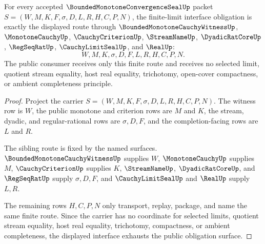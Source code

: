 \begin{theorem}
\label{thm:bounded-monotone-convergence-seal-finite-limit-interface-obligations}
For every accepted $\BoundedMonotoneConvergenceSealUp$ packet $S=(W,M,K,F,\sigma,D,L,R,H,C,P,N)$, the finite-limit interface obligation is exactly the displayed route through $\BoundedMonotoneCauchyWitnessUp$, $\MonotoneCauchyUp$, $\CauchyCriterionUp$, $\StreamNameUp$, $\DyadicRatCoreUp$, $\RegSeqRatUp$, $\CauchyLimitSealUp$, and $\RealUp$:
$$
W,M,K,\sigma,D,F,L,R,H,C,P,N.
$$
The public consumer receives only this finite route and receives no selected limit, quotient stream equality, host real equality, trichotomy, open-cover compactness, or ambient completeness principle.
\end{theorem}
\begin{proof}
Project the carrier $S=(W,M,K,F,\sigma,D,L,R,H,C,P,N)$. The witness row is $W$, the public monotone and criterion rows are $M$ and $K$, the stream, dyadic, and regular-rational rows are $\sigma,D,F$, and the completion-facing rows are $L$ and $R$.

The sibling route is fixed by the named surfaces. $\BoundedMonotoneCauchyWitnessUp$ supplies $W$, $\MonotoneCauchyUp$ supplies $M$, $\CauchyCriterionUp$ supplies $K$, $\StreamNameUp$, $\DyadicRatCoreUp$, and $\RegSeqRatUp$ supply $\sigma,D,F$, and $\CauchyLimitSealUp$ and $\RealUp$ supply $L,R$.

The remaining rows $H,C,P,N$ only transport, replay, package, and name the same finite route. Since the carrier has no coordinate for selected limits, quotient stream equality, host real equality, trichotomy, compactness, or ambient completeness, the displayed interface exhausts the public obligation surface.
\end{proof}

